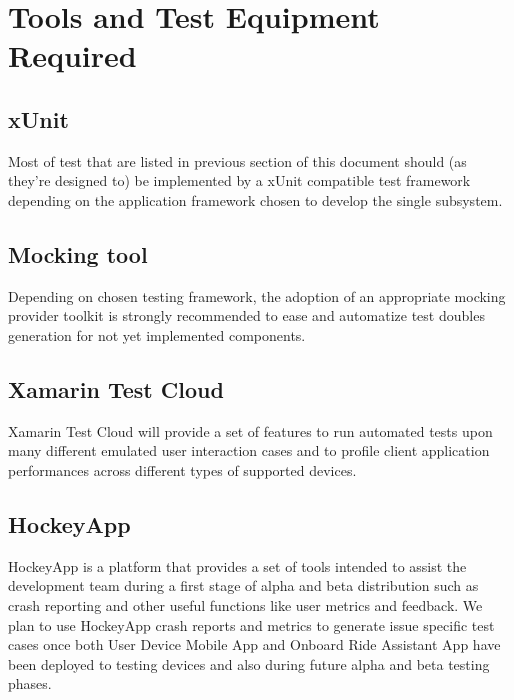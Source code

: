 \section{Tools and Test Equipment Required}
\subsection{xUnit}
Most of test that are listed in previous section of this document should (as they're designed to) be implemented by a xUnit compatible test framework depending on the application framework chosen to develop the single subsystem.

\subsection{Mocking tool}
Depending on chosen testing framework, the adoption of an appropriate mocking provider toolkit is strongly recommended to ease and automatize test doubles generation for not yet implemented components.

\subsection{Xamarin Test Cloud}
Xamarin Test Cloud will provide a set of features to run automated tests upon many different emulated user interaction cases and to profile client application performances across different types of supported devices.

\subsection{HockeyApp}
HockeyApp is a platform that provides a set of tools intended to assist the development team during a first stage of alpha and beta distribution such as crash reporting and other useful functions like user metrics and feedback. We plan to use HockeyApp crash reports and metrics to generate issue specific test cases once both User Device Mobile App and Onboard Ride Assistant App have been deployed to testing devices and also during future alpha and beta testing phases. 
